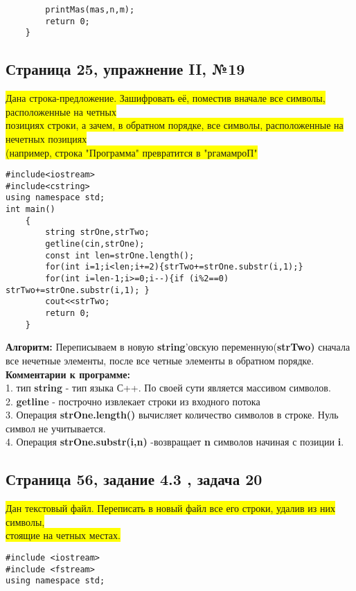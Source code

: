 \documentclass[11pt]{article}
\begin{document}
\begin{flushleft}
\begin{lstlisting}
        printMas(mas,n,m);
        return 0;
    }
\end{lstlisting}


\newpage
\begin{center}
 {\fontsize{20}{10}\selectfont {Основы программирования на языке с++ ЧАСТЬ 2}}
\end{center}

\begin{center}
\section{Страница 25, упражнение II, №19}
\colorbox{yellow}{Дана строка-предложение. Зашифровать её, поместив вначале все символы, расположенные на четных}\\
\colorbox{yellow}{позициях строки, а зачем, в обратном порядке, все символы, расположенные на нечетных позициях}\\
\colorbox{yellow}{(например, строка "Программа" превратится в "ргамамроП"}
\end{center}
\begin{lstlisting}
#include<iostream>
#include<cstring>
using namespace std;
int main()
	{
		string strOne,strTwo;
		getline(cin,strOne);
		const int len=strOne.length();
		for(int i=1;i<len;i+=2){strTwo+=strOne.substr(i,1);}
		for(int i=len-1;i>=0;i--){if (i%2==0) strTwo+=strOne.substr(i,1); }
		cout<<strTwo;
		return 0;
	}
\end{lstlisting}
\textbf{Алгоритм:}
\newline
Переписываем в новую \textbf{string}'овскую переменную(\textbf{strTwo)} сначала все нечетные элементы, после все четные элементы в обратном порядке.\\
\textbf{Комментарии к программе:} \\
1. тип \textbf{string} - тип языка С++. По своей сути является массивом символов.\\
2. \textbf{getline} - построчно извлекает строки из входного потока\\
3. Операция \textbf{strOne.length()} вычисляет количество символов в строке. Нуль символ не учитывается.\\
4. Операция \textbf{strOne.substr(i,n)} -возвращает \textbf{n} символов начиная с позиции \textbf{i}.\\


\newpage
\begin{center}
\section{Страница 56, задание 4.3 , задача 20}
\colorbox{yellow}{Дан текстовый файл. Переписать в новый файл все его строки, удалив из них символы,}\\
\colorbox{yellow}{стоящие на четных местах.}
\end{center}
\begin{lstlisting}
#include <iostream>
#include <fstream>
using namespace std;


\end{lstlisting}
\end{flushleft}
\end{document}
